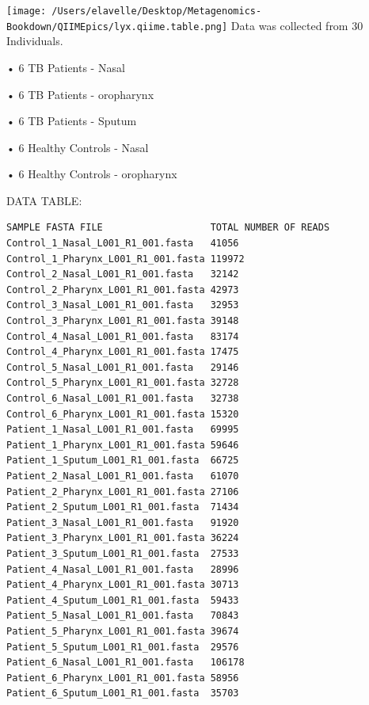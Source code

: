 \documentclass[
]{book}
\newenvironment{Shaded}{\begin{snugshade}}{\end{snugshade}}
\newcommand{\AttributeTok}[1]{\textcolor[rgb]{0.77,0.63,0.00}{#1}}
\newcommand{\BuiltInTok}[1]{#1}
\newcommand{\CommentTok}[1]{\textcolor[rgb]{0.56,0.35,0.01}{\textit{#1}}}
\newcommand{\ControlFlowTok}[1]{\textcolor[rgb]{0.13,0.29,0.53}{\textbf{#1}}}
\newcommand{\ExtensionTok}[1]{#1}
\newcommand{\KeywordTok}[1]{\textcolor[rgb]{0.13,0.29,0.53}{\textbf{#1}}}
\newcommand{\NormalTok}[1]{#1}
\newcommand{\PreprocessorTok}[1]{\textcolor[rgb]{0.56,0.35,0.01}{\textit{#1}}}
\newcommand{\VariableTok}[1]{\textcolor[rgb]{0.00,0.00,0.00}{#1}}
\begin{document}
\begin{Shaded}
\end{Shaded}

\texttt{[image: /Users/elavelle/Desktop/Metagenomics-Bookdown/QIIMEpics/lyx.qiime.table.png]}
Data was collected from 30 Individuals.

• 6 TB Patients - Nasal

• 6 TB Patients - oropharynx

• 6 TB Patients - Sputum

• 6 Healthy Controls - Nasal

• 6 Healthy Controls - oropharynx

DATA TABLE:

\begin{verbatim}
SAMPLE FASTA FILE                   TOTAL NUMBER OF READS 
Control_1_Nasal_L001_R1_001.fasta   41056
Control_1_Pharynx_L001_R1_001.fasta 119972
Control_2_Nasal_L001_R1_001.fasta   32142
Control_2_Pharynx_L001_R1_001.fasta 42973
Control_3_Nasal_L001_R1_001.fasta   32953
Control_3_Pharynx_L001_R1_001.fasta 39148
Control_4_Nasal_L001_R1_001.fasta   83174
Control_4_Pharynx_L001_R1_001.fasta 17475
Control_5_Nasal_L001_R1_001.fasta   29146
Control_5_Pharynx_L001_R1_001.fasta 32728
Control_6_Nasal_L001_R1_001.fasta   32738
Control_6_Pharynx_L001_R1_001.fasta 15320
Patient_1_Nasal_L001_R1_001.fasta   69995
Patient_1_Pharynx_L001_R1_001.fasta 59646
Patient_1_Sputum_L001_R1_001.fasta  66725
Patient_2_Nasal_L001_R1_001.fasta   61070
Patient_2_Pharynx_L001_R1_001.fasta 27106
Patient_2_Sputum_L001_R1_001.fasta  71434
Patient_3_Nasal_L001_R1_001.fasta   91920
Patient_3_Pharynx_L001_R1_001.fasta 36224
Patient_3_Sputum_L001_R1_001.fasta  27533
Patient_4_Nasal_L001_R1_001.fasta   28996
Patient_4_Pharynx_L001_R1_001.fasta 30713
Patient_4_Sputum_L001_R1_001.fasta  59433
Patient_5_Nasal_L001_R1_001.fasta   70843
Patient_5_Pharynx_L001_R1_001.fasta 39674
Patient_5_Sputum_L001_R1_001.fasta  29576
Patient_6_Nasal_L001_R1_001.fasta   106178
Patient_6_Pharynx_L001_R1_001.fasta 58956
Patient_6_Sputum_L001_R1_001.fasta  35703
\end{verbatim}
\end{document}
